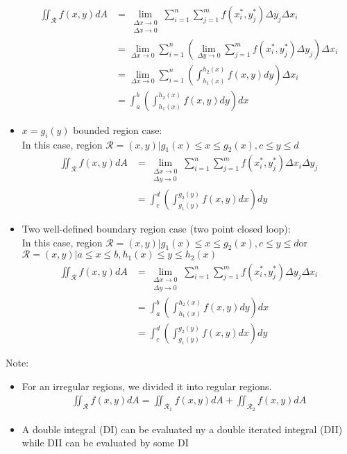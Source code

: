 \documentclass[UTF8,a4paper, 10pt, openany]{svmono}
\begin{document}
\begin{itemize}
\begin{align*}
\iint_{\mathcal{R}}f(x,y)dA &= \lim_{\substack{\Delta x\to 0\\ \Delta x\to 0}}\displaystyle\sum_{i=1}^{n}\displaystyle\sum_{j=1}^{m} f(x_i^*,y_j^*)\Delta y_{j}\Delta x_{i}\\
&= \lim_{\Delta x\to 0}\displaystyle\sum_{i=1}^{n}\left(\lim_{\Delta y\to 0}\displaystyle\sum_{j=1}^{m} f(x_i^*,y_j^*)\Delta y_{j} \right)\Delta x_{i}\\
&= \lim_{\Delta x\to 0}\displaystyle\sum_{i=1}^{n}\left(\displaystyle\int_{h_{1}(x)}^{h_{2}(x)}f(x,y)dy \right)\Delta x_{i}\\
&= \displaystyle\int_{a}^{b}\left(\displaystyle\int_{h_{1}(x)}^{h_{2}(x)}f(x,y)dy \right)dx
\end{align*}
\item $x=g_{i}(y)$ bounded region case:\\
In this case, region $\mathcal{R}={(x,y)|g_{1}(x)\leq x\leq g_{2}(x), c\leq y\leq d}$
\begin{align*}
\iint_{\mathcal{R}}f(x,y)dA &= \lim_{\substack{\Delta x\to 0\\ \Delta y\to 0}}\displaystyle\sum_{i=1}^{n}\displaystyle\sum_{j=1}^{m} f(x_i^*,y_j^*)\Delta x_{i}\Delta y_{j}\\
&= \displaystyle\int_{c}^{d}\left(\displaystyle\int_{g_{1}(y)}^{g_{2}(y)}f(x,y)dx \right)dy
\end{align*}
\item Two well-defined boundary region case (two point closed loop):\\
In this case, region $\mathcal{R}={(x,y)|g_{1}(x)\leq x\leq g_{2}(x), c\leq y\leq d}$or\\
$\mathcal{R}={(x,y)|a\leq x\leq b, h_{1}(x)\leq y\leq h_{2}(x)}$\\
\begin{align*}
\iint_{\mathcal{R}}f(x,y)dA &= \lim_{\substack{\Delta x\to 0\\ \Delta y\to 0}}\displaystyle\sum_{i=1}^{n}\displaystyle\sum_{j=1}^{m} f(x_i^*,y_j^*)\Delta y_{j}\Delta x_{i}\\
&= \displaystyle\int_{a}^{b}\left(\displaystyle\int_{h_{1}(x)}^{h_{2}(x)}f(x,y)dy \right)dx\\
&= \displaystyle\int_{c}^{d}\left(\displaystyle\int_{g_{1}(y)}^{g_{2}(y)}f(x,y)dx \right)dy
\end{align*}
\end{itemize}

Note:
\begin{itemize}
\item For an irregular regions, we divided it into regular regions.
\begin{align*}
\iint_{\mathcal{R}}f(x,y)dA=\iint_{\mathcal{R}_1}f(x,y)dA+\iint_{\mathcal{R}_2}f(x,y)dA
\end{align*}
\item A double integral (DI) can be evaluated ny a double iterated integral (DII) while DII can be evaluated by some DI
\end{itemize}
\end{document}
